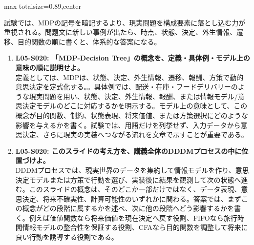 \begin{minipage}[t]{0.58\textwidth}
\begin{adjustbox}{max totalsize={\textwidth}{0.89\textheight},center}
\begin{minipage}{\textwidth}
試験では、MDPの記号を暗記するより、現実問題を構成要素に落とし込む力が重視される。問題文に新しい事例が出たら、時点、状態、決定、外生情報、遷移、目的関数の順に書くと、体系的な答案になる。\par{}\begin{enumerate}\item \textbf{L05-S020: 「MDP-Decision Tree」の概念を、定義・具体例・モデル上の意味の順に説明せよ。}\\定義としては、MDPは、状態、決定、外生情報、遷移、報酬、方策で動的意思決定を定式化する。。具体例では、配送・在庫・フードデリバリーのような現実問題を用い、状態、決定、外生情報、報酬、または情報モデル/意思決定モデルのどこに対応するかを明示する。モデル上の意味として、この概念が目的関数、制約、状態表現、将来価値、または方策選択にどのような影響を与えるかを書く。試験では、用語だけを列挙せず、入力データから意思決定、さらに現実の実装へつながる流れを文章で示すことが重要である。\item \textbf{L05-S020: このスライドの考え方を、講義全体のDDDMプロセスの中に位置づけよ。}\\DDDMプロセスでは、現実世界のデータを集約して情報モデルを作り、意思決定モデルまたは方策で行動を選び、実装後に結果を観測して次の状態へ進む。このスライドの概念は、そのどこか一部だけではなく、データ表現、意思決定、将来不確実性、計算可能性のいずれかに関わる。答案では、まずこの概念がどの段階に属するかを述べ、次に他の段階へどう影響するかを書く。例えば価値関数なら将来価値を現在決定へ戻す役割、FIFOなら旅行時間情報モデルの整合性を保証する役割、CFAなら目的関数を調整して将来に良い行動を誘導する役割である。\end{enumerate}
\end{minipage}
\end{adjustbox}
\end{minipage}


